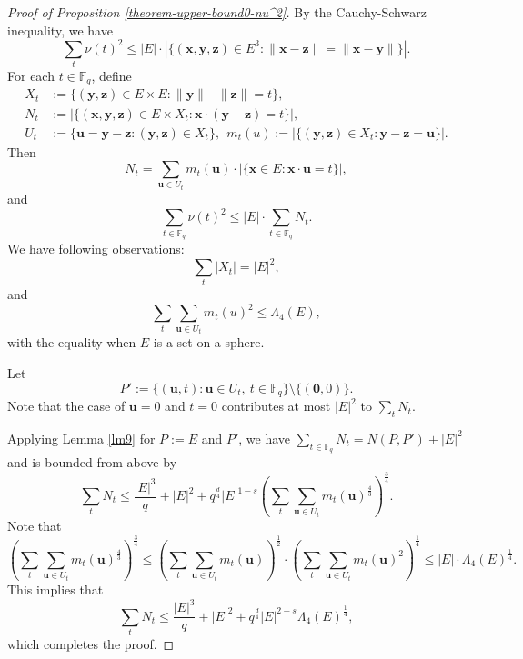 \documentclass[11pt]{article}
\def\thang#1{\noindent
\textcolor{blue}
{\textsc{(Thang:}
\textsf{#1})}}
\begin{document}
\begin{proof}[Proof of Proposition \ref{theorem-upper-bound0-nu^2}]
    By the Cauchy-Schwarz inequality, we have 
    \[\sum_{t}\nu(t)^2\le |E|\cdot |\{(\mathbf{x}, \mathbf{y}, \mathbf{z})\in E^3\colon \|\mathbf{x}-\mathbf{z}\|=\|\mathbf{x}-\mathbf{y}\|\}|.\]
For each $t\in \mathbb{F}_q$, define
\begin{align*}
X_t &:= \{(\mathbf{y},\mathbf{z}) \in E \times E : \|\mathbf{y}\| - \|\mathbf{z}\| = t\},\\
N_t &:= |\{(\mathbf{x},\mathbf{y},\mathbf{z}) \in E \times X_t : \mathbf{x} \cdot (\mathbf{y}-\mathbf{z}) = t\}|,\\
U_t &:= \{\mathbf{u} = \mathbf{y} - \mathbf{z} : (\mathbf{y},\mathbf{z}) \in X_t\}, ~~m_t(u):= |\{(\mathbf{y},\mathbf{z}) \in X_t : \mathbf{y} - \mathbf{z} = \mathbf{u}\}|.
\end{align*}
Then
$$N_t = \sum_{\mathbf{u} \in U_t} m_t(\mathbf{u}) \cdot |\{\mathbf{x} \in E : \mathbf{x} \cdot \mathbf{u} = t\}|,$$
and 
\[\sum_{t\in \mathbb{F}_q}\nu(t)^2\le |E|\cdot \sum_{t\in \mathbb{F}_q}N_t.\]
We have following observations: 
$$\sum_t |X_t| = |E|^2,$$
and 
$$\sum_t \sum_{\mathbf{u} \in U_t} m_t(u)^2 \leq \Lambda_4(E),$$
with the equality when $E$ is a set on a sphere.

Let
\[P':=\{(\mathbf{u}, t)\colon \mathbf{u}\in U_t,  ~t\in \mathbb F_q\}\setminus \{(\mathbf{0}, 0)\}.\]
Note that the case of $\mathbf{u}=0$ and $t=0$ contributes at most $|E|^2$ to $\sum_{t}N_t$.

Applying Lemma \ref{lm9} for $P:=E$ and $P'$, we have $\sum_{t\in \mathbb{F}_q}N_t=N(P, P')+|E|^2$ and is bounded from above by
\[\sum_{t}N_t\le \frac{|E|^3}{q}+|E|^2+q^{\frac{d}{4}}|E|^{1-s}\left( \sum_t \sum_{\mathbf{u} \in U_t}m_t(\mathbf{u})^{\frac{4}{3}} \right)^{\frac{3}{4}}.\]
Note that 
\[\left( \sum_t \sum_{\mathbf{u} \in U_t} m_t(\mathbf{u})^{\frac{4}{3}} \right)^{\frac{3}{4}}\le \left( \sum_t \sum_{\mathbf{u} \in U_t} m_t(\mathbf{u}) \right)^{\frac{1}{2}}\cdot \left( \sum_t \sum_{\mathbf{u} \in U_t} m_t(\mathbf{u})^{2} \right)^{\frac{1}{4}}\le |E|\cdot \Lambda_4(E)^{\frac{1}{4}}.\]
This implies that 
\[\sum_{t}N_t\le \frac{|E|^3}{q}+|E|^2+q^{\frac{d}{4}}|E|^{2-s}\Lambda_4(E)^{\frac{1}{4}},\]
which completes the proof.
\end{proof}

\end{document}
